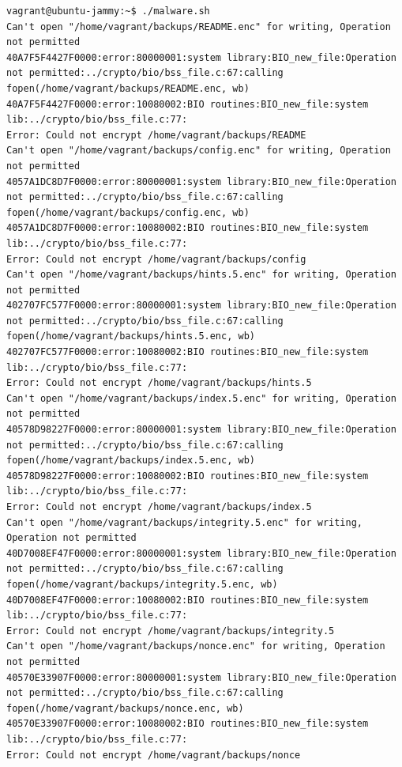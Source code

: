 \begin{lstlisting}[language=code, caption={Output van het bash-script op de immutable map.}]
vagrant@ubuntu-jammy:~$ ./malware.sh
Can't open "/home/vagrant/backups/README.enc" for writing, Operation not permitted
40A7F5F4427F0000:error:80000001:system library:BIO_new_file:Operation not permitted:../crypto/bio/bss_file.c:67:calling fopen(/home/vagrant/backups/README.enc, wb)
40A7F5F4427F0000:error:10080002:BIO routines:BIO_new_file:system lib:../crypto/bio/bss_file.c:77:
Error: Could not encrypt /home/vagrant/backups/README
Can't open "/home/vagrant/backups/config.enc" for writing, Operation not permitted
4057A1DC8D7F0000:error:80000001:system library:BIO_new_file:Operation not permitted:../crypto/bio/bss_file.c:67:calling fopen(/home/vagrant/backups/config.enc, wb)
4057A1DC8D7F0000:error:10080002:BIO routines:BIO_new_file:system lib:../crypto/bio/bss_file.c:77:
Error: Could not encrypt /home/vagrant/backups/config
Can't open "/home/vagrant/backups/hints.5.enc" for writing, Operation not permitted
402707FC577F0000:error:80000001:system library:BIO_new_file:Operation not permitted:../crypto/bio/bss_file.c:67:calling fopen(/home/vagrant/backups/hints.5.enc, wb)
402707FC577F0000:error:10080002:BIO routines:BIO_new_file:system lib:../crypto/bio/bss_file.c:77:
Error: Could not encrypt /home/vagrant/backups/hints.5
Can't open "/home/vagrant/backups/index.5.enc" for writing, Operation not permitted
40578D98227F0000:error:80000001:system library:BIO_new_file:Operation not permitted:../crypto/bio/bss_file.c:67:calling fopen(/home/vagrant/backups/index.5.enc, wb)
40578D98227F0000:error:10080002:BIO routines:BIO_new_file:system lib:../crypto/bio/bss_file.c:77:
Error: Could not encrypt /home/vagrant/backups/index.5
Can't open "/home/vagrant/backups/integrity.5.enc" for writing, Operation not permitted
40D7008EF47F0000:error:80000001:system library:BIO_new_file:Operation not permitted:../crypto/bio/bss_file.c:67:calling fopen(/home/vagrant/backups/integrity.5.enc, wb)
40D7008EF47F0000:error:10080002:BIO routines:BIO_new_file:system lib:../crypto/bio/bss_file.c:77:
Error: Could not encrypt /home/vagrant/backups/integrity.5
Can't open "/home/vagrant/backups/nonce.enc" for writing, Operation not permitted
40570E33907F0000:error:80000001:system library:BIO_new_file:Operation not permitted:../crypto/bio/bss_file.c:67:calling fopen(/home/vagrant/backups/nonce.enc, wb)
40570E33907F0000:error:10080002:BIO routines:BIO_new_file:system lib:../crypto/bio/bss_file.c:77:
Error: Could not encrypt /home/vagrant/backups/nonce
\end{lstlisting}
